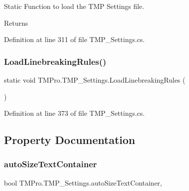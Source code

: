 Static Function to load the T\+MP Settings file. 

\begin{DoxyReturn}{Returns}

\end{DoxyReturn}


Definition at line 311 of file T\+M\+P\+\_\+\+Settings.\+cs.

\mbox{\label{class_t_m_pro_1_1_t_m_p___settings_a62c9400a6bead12907767a9c56aad083}} 
\subsubsection{\texorpdfstring{LoadLinebreakingRules()}{LoadLinebreakingRules()}}
{\footnotesize\ttfamily static void T\+M\+Pro.\+T\+M\+P\+\_\+\+Settings.\+Load\+Linebreaking\+Rules (\begin{DoxyParamCaption}{ }\end{DoxyParamCaption})\hspace{0.3cm}{\ttfamily [static]}}



Definition at line 373 of file T\+M\+P\+\_\+\+Settings.\+cs.



\subsection{Property Documentation}
\mbox{\label{class_t_m_pro_1_1_t_m_p___settings_af4d34759470d229c8a600bc45a9aac35}} 
\subsubsection{\texorpdfstring{autoSizeTextContainer}{autoSizeTextContainer}}
{\footnotesize\ttfamily bool T\+M\+Pro.\+T\+M\+P\+\_\+\+Settings.\+auto\+Size\+Text\+Container\hspace{0.3cm}{\ttfamily [static]}, {\ttfamily [get]}}



